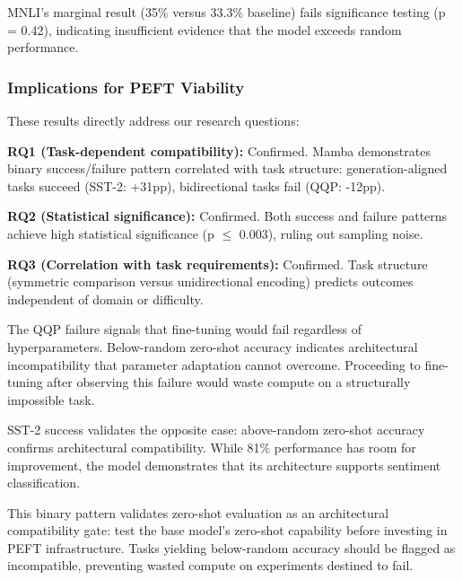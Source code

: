 MNLI's marginal result (35\% versus 33.3\% baseline) fails significance testing (p = 0.42), indicating insufficient evidence that the model exceeds random performance.

\subsubsection{Implications for PEFT Viability}

These results directly address our research questions:

\textbf{RQ1 (Task-dependent compatibility):} Confirmed. Mamba demonstrates binary success/failure pattern correlated with task structure: generation-aligned tasks succeed (SST-2: +31pp), bidirectional tasks fail (QQP: -12pp).

\textbf{RQ2 (Statistical significance):} Confirmed. Both success and failure patterns achieve high statistical significance (p $\leq$ 0.003), ruling out sampling noise.

\textbf{RQ3 (Correlation with task requirements):} Confirmed. Task structure (symmetric comparison versus unidirectional encoding) predicts outcomes independent of domain or difficulty.

The QQP failure signals that fine-tuning would fail regardless of hyperparameters. Below-random zero-shot accuracy indicates architectural incompatibility that parameter adaptation cannot overcome. Proceeding to fine-tuning after observing this failure would waste compute on a structurally impossible task.

SST-2 success validates the opposite case: above-random zero-shot accuracy confirms architectural compatibility. While 81\% performance has room for improvement, the model demonstrates that its architecture supports sentiment classification.

This binary pattern validates zero-shot evaluation as an architectural compatibility gate: test the base model's zero-shot capability before investing in PEFT infrastructure. Tasks yielding below-random accuracy should be flagged as incompatible, preventing wasted compute on experiments destined to fail.
